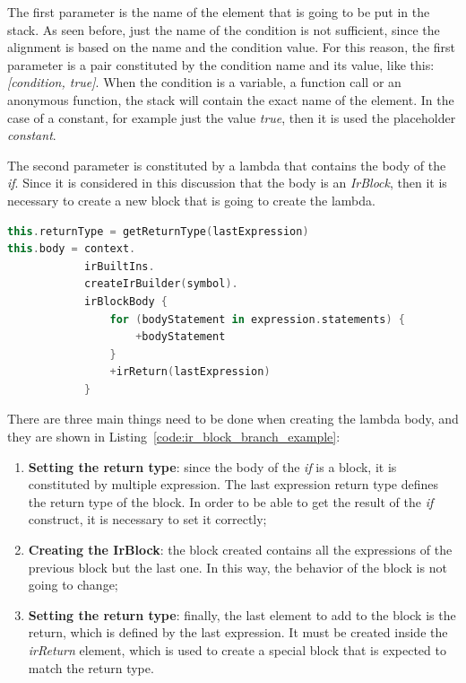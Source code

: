 The first parameter is the name of the element that is going to be put in the stack. As seen before, just the name of the condition is not sufficient, since the alignment is based on the name and the condition value. For this reason, the first parameter is a pair constituted by the condition name and its value, like this: \textit{[condition, true]}.\newline
When the condition is a variable, a function call or an anonymous function, the stack will contain the exact name of the element. In the case of a constant, for example just the value \textit{true}, then it is used the placeholder \textit{constant}.

The second parameter is constituted by a lambda that contains the body of the \textit{if}. Since it is considered in this discussion that the body is an \textit{IrBlock}, then it is necessary to create a new block that is going to create the lambda.
\begin{lstlisting}[caption={Creation of the lambda body when modifying a \textit{IrBranch}}, captionpos=b, language=Kotlin, label={code:ir_block_branch_example}]
this.returnType = getReturnType(lastExpression)
this.body = context.
            irBuiltIns.
            createIrBuilder(symbol).
            irBlockBody {
                for (bodyStatement in expression.statements) { 
                    +bodyStatement 
                }
                +irReturn(lastExpression)
            }
\end{lstlisting}
There are three main things need to be done when creating the lambda body, and they are shown in Listing~\ref{code:ir_block_branch_example}:
\begin{enumerate}
    \item \textbf{Setting the return type}: since the body of the \textit{if} is a block, it is constituted by multiple expression. The last expression return type defines the return type of the block. In order to be able to get the result of the \textit{if} construct, it is necessary to set it correctly;
    \item \textbf{Creating the IrBlock}: the block created contains all the expressions of the previous block but the last one. In this way, the behavior of the block is not going to change;
    \item \textbf{Setting the return type}: finally, the last element to add to the block is the return, which is defined by the last expression. It must be created inside the \textit{irReturn} element, which is used to create a special block that is expected to match the return type.
\end{enumerate}

